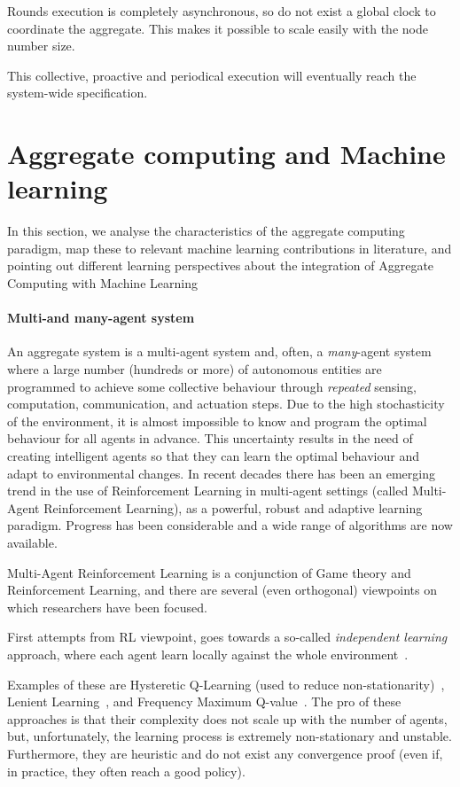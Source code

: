 \documentclass[conference]{IEEEtran}
\begin{document}
Rounds execution is completely asynchronous, so do not exist a global clock to coordinate the aggregate. 
 This makes it possible to scale easily with the node number size.

This collective, proactive and periodical execution will eventually reach the system-wide specification.

\section{Aggregate computing and Machine learning}

In this section,
 we analyse the characteristics of the aggregate computing paradigm,
 map these to relevant machine learning contributions in literature,
 and pointing out different learning perspectives about the integration of Aggregate Computing with Machine Learning

\paragraph{Multi-and many-agent system}
%
An aggregate system is a multi-agent system
 and, often, a \emph{many}-agent system
 where a large number (hundreds or more)
 of autonomous entities are programmed to achieve 
 some collective behaviour through \emph{repeated} 
 sensing, computation, communication, and actuation steps.
%
Due to the high stochasticity of the environment,
 it is almost impossible to know and
 program the optimal behaviour for all agents in advance.
 This uncertainty results in the need of creating intelligent agents
 so that they can learn the optimal behaviour and adapt to environmental changes.
%
In recent decades there has been an emerging trend in the use of Reinforcement Learning 
 in multi-agent settings (called Multi-Agent Reinforcement Learning), as a powerful, robust and adaptive learning paradigm.
 Progress has been considerable and a wide range of algorithms are now available.

Multi-Agent Reinforcement Learning is a conjunction of Game theory and Reinforcement Learning, 
 and there are several (even orthogonal) viewpoints on which researchers have been focused.

First attempts from RL viewpoint, 
 goes towards a so-called \textit{independent learning}~\cite{DBLP:journals/tsmc/BusoniuBS08} approach, 
 where each agent learn locally against the whole environment~\cite{DBLP:conf/icml/Tan93}.

Examples of these are Hysteretic Q-Learning (used to reduce non-stationarity)~\cite{hysteretic-q}, 
 Lenient Learning~\cite{DBLP:journals/jmlr/WeiL16}, and Frequency Maximum Q-value~\cite{DBLP:conf/atal/KaisersT10}.
%
The pro of these approaches is that their complexity does not scale up with the number of agents, 
 but, unfortunately, the learning process is extremely non-stationary and unstable.
% 
Furthermore, they are heuristic and do not exist any convergence proof (even if, in practice, they often reach a good policy).
\end{document}
